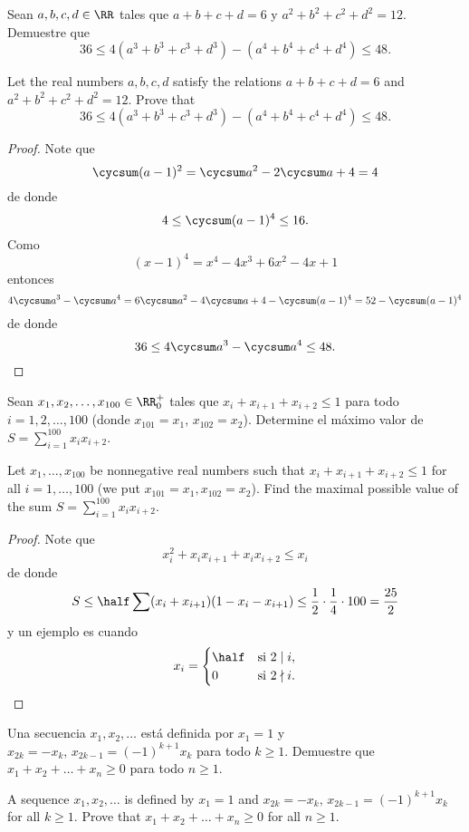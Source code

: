 \begin{probEB}[ISL 2010/A2]
  Sean $a,b,c,d\in\RR$ tales que $a+b+c+d=6$ y $a^2+b^2+c^2+d^2=12$. Demuestre
  que
  \[36\le 4(a^3+b^3+c^3+d^3)-(a^4+b^4+c^4+d^4)\le 48.\]
  \begin{hint}
    Let the real numbers $a,b,c,d$ satisfy the relations $a+b+c+d=6$ and
    $a^2+b^2+c^2+d^2=12$. Prove that
    \[36\le 4(a^3+b^3+c^3+d^3)-(a^4+b^4+c^4+d^4)\le 48.\]
  \end{hint}
\end{probEB}

\begin{proof}
  Note que
  \[\cycsum(a-1)^2=\cycsum a^2-2\cycsum a+4=4\]
  de donde
  \[4\le\cycsum(a-1)^4\le 16.\]
  Como
  \[(x-1)^4=x^4-4x^3+6x^2-4x+1\]
  entonces
  \[
    4\cycsum a^3-\cycsum a^4
    =6\cycsum a^2-4\cycsum a+4-\cycsum(a-1)^4
    =52-\cycsum(a-1)^4
  \]
  de donde
  \[36\le 4\cycsum a^3-\cycsum a^4\le 48.\]
\end{proof}

\begin{probMG}[ISL 2010/A3]
  Sean $x_1,x_2,\dots,x_{100}\in\RR_0^+$ tales que $x_i+x_{i+1}+x_{i+2}\le 1$
  para todo $i=1,2,\dots,100$ (donde $x_{101}=x_1$, $x_{102}=x_2$). Determine el
  máximo valor de $S=\sum_{i=1}^{100}x_ix_{i+2}$.
  \begin{hint}
    Let $x_1,\dots,x_{100}$ be nonnegative real numbers such that
    $x_i+x_{i+1}+x_{i+2}\le 1$ for all $i=1,\dots,100$ (we put
    $x_{101}=x_1,x_{102}=x_2$). Find the maximal possible value of the sum
    $S=\sum^{100}_{i=1}x_ix_{i+2}$.
  \end{hint}
\end{probMG}

\begin{proof}
  Note que
  \[x_i^2+x_ix_{i+1}+x_ix_{i+2}\le x_i\]
  de donde
  \[
    S
    \le\half\sum(x_i+x_{i+1})(1-x_i-x_{i+1})
    \le\frac12\cdot\frac14\cdot 100
    =\frac{25}{2}
  \]
  y un ejemplo es cuando
  \[
    x_i=\begin{cases}
      \half & \text{si }2\mid i, \\
      0 & \text{si }2\nmid i.
    \end{cases}
  \]
\end{proof}

\begin{probEG}[ISL 2010/A4]
  Una secuencia $x_1,x_2,\dots$ está definida por $x_1=1$ y
  $x_{2k}=-x_k,\,x_{2k-1}=(-1)^{k+1}x_k$ para todo $k\ge 1$. Demuestre que
  $x_1+x_2+\dots+x_n\ge 0$ para todo $n\ge 1$.
  \begin{hint}
    A sequence $x_1,x_2,\dots$ is defined by $x_1=1$ and
    $x_{2k}=-x_k,\,x_{2k-1}=(-1)^{k+1}x_k$ for all $k\ge 1$. Prove that
    $x_1+x_2+\dots+x_n\ge 0$ for all $n\ge 1$.
  \end{hint}
\end{probEG}

